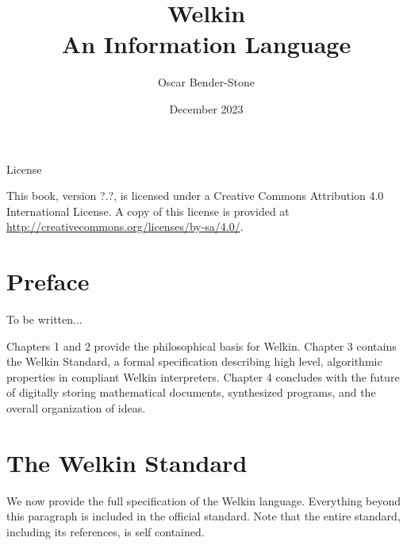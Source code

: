 \documentclass[oneside, leqno]{book}
\title{Welkin \\
  An Information Language}
\author{Oscar Bender-Stone}
\date{December 2023}
\begin{document}
\maketitle


\begin{center}
{\sc License}\

\vspace{2ex}
This book, version ?.?, is licensed under a Creative Commons Attribution 4.0 International License.
A copy of this license is provided at \url{http://creativecommons.org/licenses/by-sa/4.0/}.
\end{center}

\newpage

\chapter*{Preface}

To be written...


Chapters 1 and 2 provide the philosophical basis for Welkin. Chapter 3 contains the Welkin Standard, a formal specification describing high level, algorithmic properties in compliant Welkin interpreters. Chapter 4 concludes with the future of digitally storing mathematical documents, synthesized programs, and the overall organization of ideas.


\mainmatter



\chapter{The Welkin Standard}

We now provide the full specification of the Welkin language. Everything beyond this paragraph is included in the official standard. Note that the entire standard, including its references, is self contained.



\end{document}
